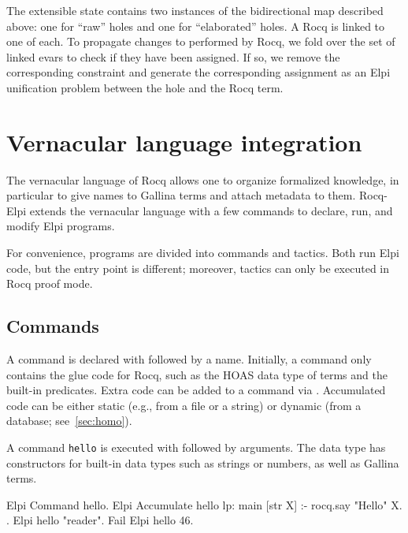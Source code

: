 \documentclass[a4paper, 11pt]{book}
\begin{document}
\noindent
The extensible state contains two instances of the bidirectional map
described above: one for ``raw'' holes and one for ``elaborated'' holes. A Rocq
 is linked to one of each.
To propagate changes to  performed by Rocq, we fold
over the set of linked evars to check if they have been assigned. If so, we
remove the corresponding  constraint and generate the corresponding
assignment as an Elpi unification problem between the hole and the Rocq term.



\section{Vernacular language integration}


The vernacular language of Rocq allows one to organize formalized knowledge,
in particular to give names to Gallina terms and attach metadata to them.
Rocq-Elpi extends the vernacular language with a few commands to declare, run,
and modify Elpi programs.

For convenience, programs are divided into commands and tactics. Both run Elpi
code, but the entry point is different; moreover, tactics can only be executed
in Rocq proof mode.

\subsection{Commands}

A command is declared with  followed by a name. Initially,
a command only contains the glue code for Rocq, such as the HOAS data type of
terms and the built-in predicates. Extra code can be added to a command via
. Accumulated code can be either static (e.g., from a
file or a string) or dynamic (from a database; see~\cref{sec:homo}).

A command \texttt{hello} is executed with  followed by
arguments. The  data type has constructors for built-in data
types such as strings or numbers, as well as Gallina terms.

\begin{rocqcode}
Elpi Command hello.
Elpi Accumulate hello lp:{{
  main [str X] :- rocq.say "Hello" X.
}}.
Elpi hello "reader".
Fail Elpi hello 46.
\end{rocqcode}
\end{document}
